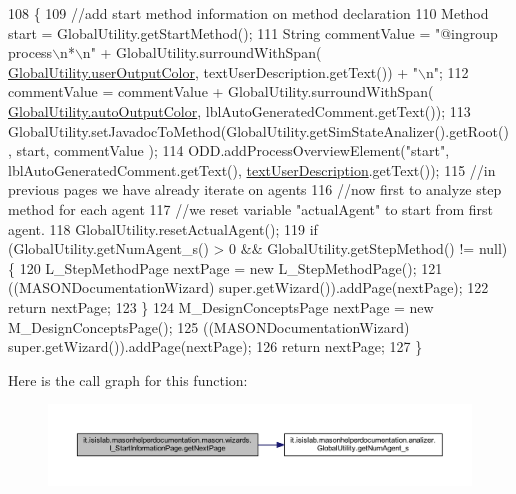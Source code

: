 \begin{DoxyCode}
108                                     \{ 
109         \textcolor{comment}{//add start method information on method declaration}
110         Method start = GlobalUtility.getStartMethod();
111         String commentValue = \textcolor{stringliteral}{"@ingroup process\(\backslash\)n*\(\backslash\)n"} + GlobalUtility.surroundWithSpan(
      \hyperlink{classit_1_1isislab_1_1masonhelperdocumentation_1_1analizer_1_1_global_utility_aec864cd710b27ece609c5a6093211ff4}{GlobalUtility.userOutputColor}, textUserDescription.getText()) + \textcolor{stringliteral}{"\(\backslash\)n"};
112         commentValue = commentValue + GlobalUtility.surroundWithSpan(
      \hyperlink{classit_1_1isislab_1_1masonhelperdocumentation_1_1analizer_1_1_global_utility_a42aa676ad1ff27c42cd4aab651ff2a35}{GlobalUtility.autoOutputColor}, lblAutoGeneratedComment.getText());
113         GlobalUtility.setJavadocToMethod(GlobalUtility.getSimStateAnalizer().getRoot(), start, commentValue
      );
114         ODD.addProcessOverviewElement(\textcolor{stringliteral}{"start"}, lblAutoGeneratedComment.getText(), 
      \hyperlink{classit_1_1isislab_1_1masonhelperdocumentation_1_1mason_1_1wizards_1_1_i___start_information_page_a5b9b23fd18d352b235614b6bdfd23477}{textUserDescription}.getText());
115         \textcolor{comment}{//in previous pages we have already iterate on agents}
116         \textcolor{comment}{//now first to analyze step method for each agent}
117         \textcolor{comment}{//we reset variable "actualAgent" to start from first agent.}
118         GlobalUtility.resetActualAgent();
119         \textcolor{keywordflow}{if} (GlobalUtility.getNumAgent\_s() > 0 && GlobalUtility.getStepMethod() != null)\{
120             L\_StepMethodPage nextPage = \textcolor{keyword}{new} L\_StepMethodPage();
121             ((MASONDocumentationWizard) super.getWizard()).addPage(nextPage);
122             \textcolor{keywordflow}{return} nextPage;
123         \}
124         M\_DesignConceptsPage nextPage = \textcolor{keyword}{new} M\_DesignConceptsPage();
125         ((MASONDocumentationWizard) super.getWizard()).addPage(nextPage);
126         \textcolor{keywordflow}{return} nextPage;
127     \}
\end{DoxyCode}


Here is the call graph for this function\-:
\nopagebreak
\begin{figure}[H]
\begin{center}
\leavevmode
\includegraphics[width=350pt]{classit_1_1isislab_1_1masonhelperdocumentation_1_1mason_1_1wizards_1_1_i___start_information_page_af04d37e7abfe04292439e4df5d63ceb8_cgraph}
\end{center}
\end{figure}


